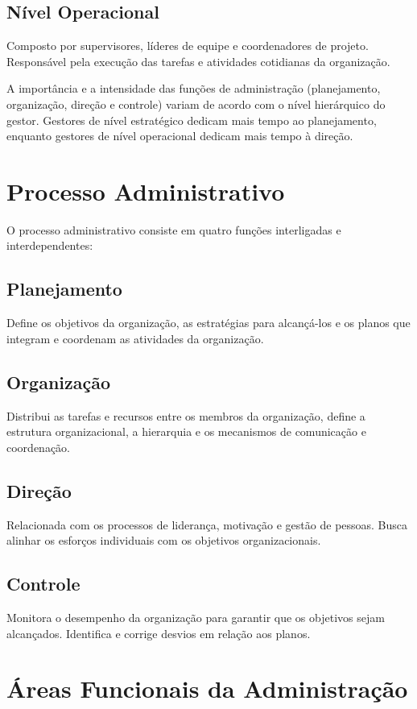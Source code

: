 \subsection{Nível Operacional}
Composto por supervisores, líderes de equipe e coordenadores de projeto. Responsável pela execução das tarefas e atividades cotidianas da organização.

A importância e a intensidade das funções de administração (planejamento, organização, direção e controle) variam de acordo com o nível hierárquico do gestor. Gestores de nível estratégico dedicam mais tempo ao planejamento, enquanto gestores de nível operacional dedicam mais tempo à direção.

\section{Processo Administrativo}

O processo administrativo consiste em quatro funções interligadas e interdependentes:

\subsection{Planejamento}
Define os objetivos da organização, as estratégias para alcançá-los e os planos que integram e coordenam as atividades da organização.

\subsection{Organização}
Distribui as tarefas e recursos entre os membros da organização, define a estrutura organizacional, a hierarquia e os mecanismos de comunicação e coordenação.

\subsection{Direção}
Relacionada com os processos de liderança, motivação e gestão de pessoas. Busca alinhar os esforços individuais com os objetivos organizacionais.

\subsection{Controle}
Monitora o desempenho da organização para garantir que os objetivos sejam alcançados. Identifica e corrige desvios em relação aos planos.

\section{Áreas Funcionais da Administração}

